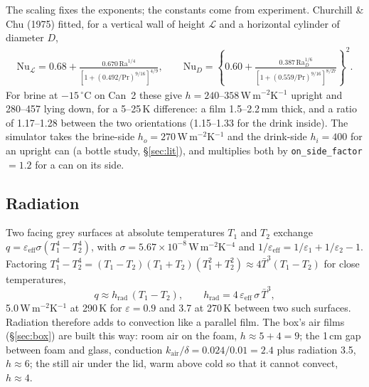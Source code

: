 \documentclass[11pt,a4paper]{article}
\newcommand{\dC}{\,^{\circ}\mathrm{C}}
\newcommand{\code}[1]{\texttt{#1}}
\begin{document}
The scaling fixes the exponents; the constants come from experiment. Churchill \& Chu (1975) fitted,
for a vertical wall of height $\mathcal L$ and a horizontal cylinder of diameter $D$,
\begin{gather*}
\mathrm{Nu}_{\mathcal L} = 0.68 + \frac{0.670\,\mathrm{Ra}^{1/4}}{[1 + (0.492/\mathrm{Pr})^{9/16}]^{4/9}},
\qquad
\mathrm{Nu}_D = \left\{0.60 + \frac{0.387\,\mathrm{Ra}_D^{1/6}}{[1 + (0.559/\mathrm{Pr})^{9/16}]^{8/27}}\right\}^2 .
\end{gather*}
For brine at $-15\dC$ on Can~2 these give $h = 240$–$358$\,W\,m$^{-2}$K$^{-1}$ upright and 280–457 lying
down, for a 5–25\,K difference: a film 1.5–2.2\,mm thick, and a ratio of 1.17–1.28 between the two
orientations (1.15–1.33 for the drink inside). The simulator takes the brine-side
$h_o = 270$\,W\,m$^{-2}$K$^{-1}$ and the drink-side $h_i = 400$ for an upright can (a bottle study,
§\ref{sec:lit}), and multiplies both by \code{on\_side\_factor} $= 1.2$ for a can on its side.

\subsection{Radiation}
\label{sec:radiation}
Two facing grey surfaces at absolute temperatures $T_1$ and $T_2$ exchange
$q = \varepsilon_{\text{eff}}\sigma(T_1^4 - T_2^4)$, with $\sigma = 5.67\times10^{-8}$\,W\,m$^{-2}$K$^{-4}$ and
$1/\varepsilon_{\text{eff}} = 1/\varepsilon_1 + 1/\varepsilon_2 - 1$. Factoring
$T_1^4 - T_2^4 = (T_1 - T_2)(T_1 + T_2)(T_1^2 + T_2^2) \approx 4\bar T^3(T_1 - T_2)$ for close
temperatures,
\begin{equation}
q \approx h_{\text{rad}}\,(T_1 - T_2),\qquad h_{\text{rad}} = 4\,\varepsilon_{\text{eff}}\,\sigma\,\bar T^3 ,
\label{eq:hrad}
\end{equation}
5.0\,W\,m$^{-2}$K$^{-1}$ at 290\,K for $\varepsilon = 0.9$ and 3.7 at 270\,K between two such surfaces.
Radiation therefore adds to convection like a parallel film. The box's air films (§\ref{sec:box}) are
built this way: room air on the foam, $h \approx 5 + 4 = 9$; the 1\,cm gap between foam and glass,
conduction $k_{\text{air}}/\delta = 0.024/0.01 = 2.4$ plus radiation 3.5, $h \approx 6$; the still air
under the lid, warm above cold so that it cannot convect, $h \approx 4$.
\end{document}
